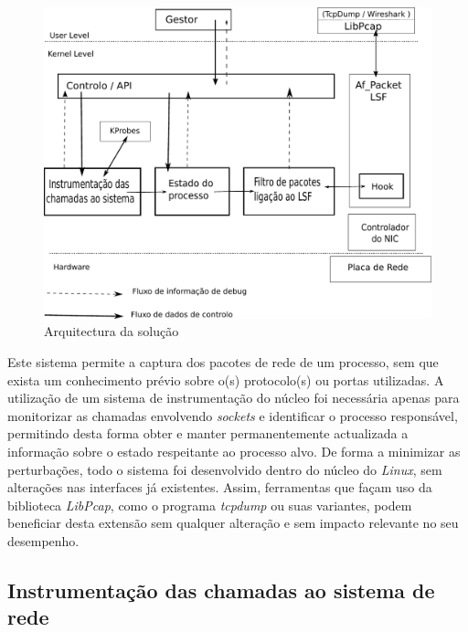 \documentclass[a4paper]{llncs}
\begin{document}
\begin{figure}[htbp]
\begin{center}
\includegraphics[scale=0.5]{interface.pdf} 
\caption{Arquitectura da solução}
\label{arquitectura}
\end{center}
\end{figure}


Este sistema permite a captura dos pacotes de rede de um processo, sem que exista um conhecimento prévio sobre o(s) protocolo(s) ou portas utilizadas.
 A utilização de um sistema de instrumentação do núcleo foi necessária apenas para monitorizar as chamadas envolvendo \emph{sockets} e identificar o processo responsável, permitindo desta forma obter e manter permanentemente actualizada a informação sobre o estado respeitante ao processo alvo.
 De forma a minimizar as perturbações, todo o sistema foi desenvolvido dentro do núcleo do \textit{Linux}, sem alterações nas interfaces já existentes.
 Assim, ferramentas que façam uso da biblioteca \textit{LibPcap}, como o programa \textit{tcpdump} ou suas variantes, podem beneficiar desta extensão sem qualquer alteração e sem impacto relevante no seu desempenho.



\subsection*{Instrumentação das chamadas ao sistema de rede}
\label{sub:mon_syscalls}
\end{document}
